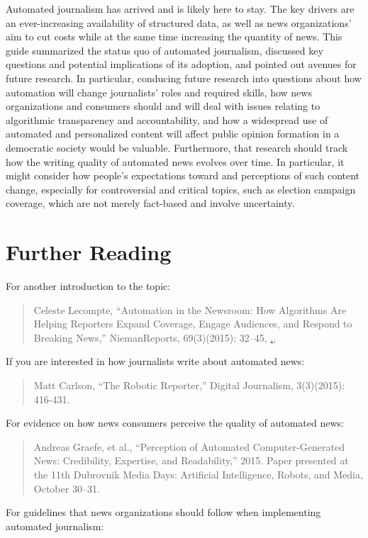 \documentclass[notoc, symmetric, nobib, nols]{towcenter-guideto-book}
\begin{document}
Automated journalism has arrived and is likely here to stay. The key drivers are an ever-increasing availability of structured data, as well as news organizations' aim to cut costs while at the same time increasing the quantity of news. This guide summarized the status quo of automated journalism, discussed key questions and potential implications of its adoption, and pointed out avenues for future research. In particular, conducing future research into questions about how automation will change journalists' roles and required skills, how news organizations and consumers should and will deal with issues relating to algorithmic transparency and accountability, and how a widespread use of automated and personalized content will affect public opinion formation in a democratic society would be valuable. Furthermore, that research should track how the writing quality of automated news evolves over time. In particular, it might consider how people's expectations toward and perceptions of such content change, especially for controversial and critical topics, such as election campaign coverage, which are not merely fact-based and involve uncertainty.

\chapter{Further Reading}

\noindent For another introduction to the topic:

\begin{quote}Celeste Lecompte, ``Automation in the Newsroom: How Algorithms Are Helping Reporters Expand Coverage, Engage Audiences, and Respond to Breaking News,'' NiemanReports, 69(3)(2015): 32--45, \href{http://niemanreports.org/articles/automation-in-the-newsroom/}., 
\end{quote}

\noindent If you are interested in how journalists write about automated news:

\begin{quote}Matt Carlson, ``The Robotic Reporter,'' Digital Journalism, 3(3)(2015): 416-431. 
\end{quote}

\noindent For evidence on how news consumers perceive the quality of automated news:

\begin{quote}Andreas Graefe, et al., ``Perception of Automated Computer-Generated News: Credibility, Expertise, and Readability,'' 2015. Paper presented at the 11th Dubrovnik Media Days: Artificial Intelligence, Robots, and Media, October 30--31. 
\end{quote}
\noindent For guidelines that news organizations should follow when implementing automated journalism:
\end{document}
